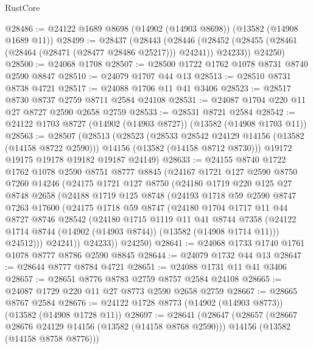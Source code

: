 \begin{lexlean}{RustCore}
\begin{coremodule}
@28486 := @24122 @1689 @8698 (@14902 (@14903 @8698)) (@13582 (@14908 @1689 @11))
@28499 := @28437
    (@28443
      (@28446 (@28452 (@28455 (@28461 (@28464 (@28471 (@28477 @28486 @25217))) @24241)) @24233))
      @24250)
@28500 := @24068 @1708
@28507 := @28500 @1722 @1762 @1078 @8731 @8740 @2590 @8847
@28510 := @24079 @1707 @44 @13
@28513 := @28510 @8731 @8738 @4721
@28517 := @24088 @1706 @11 @41 @3406
@28523 := @28517 @8730 @8737 @2759 @8711 @2584 @24108
@28531 := @24087 @1704 @220 @11 @27 @8727 @2590 @2658 @2759
@28533 := @28531 @8721 @2584
@28542 := @24122 @1703 @8727 (@14902 (@14903 @8727)) (@13582 (@14908 @1703 @11))
@28563 := @28507
    (@28513
      (@28523
        (@28533 @28542 @24129 @14156 (@13582 (@14158 @8722 @2590)))
        @14156
        (@13582 (@14158 @8712 @8730)))
      @19172
      @19175
      @19178
      @19182
      @19187
      @24149)
@28633 := @24155
    @8740
    @1722
    @1762
    @1078
    @2590
    @8751
    @8777
    @8845
    (@24167
      @1721
      @127
      @2590
      @8750
      @7260
      @14246
      (@24175
        @1721
        @127
        @8750
        (@24180
          @1719
          @220
          @125
          @27
          @8748
          @2658
          (@24188
            @1719
            @125
            @8748
            (@24193
              @1718
              @59
              @2590
              @8747
              @7263
              @17600
              (@24175
                @1718
                @59
                @8747
                (@24180
                  @1704
                  @1717
                  @11
                  @44
                  @8727
                  @8746
                  @28542
                  (@24180
                    @1715
                    @1119
                    @11
                    @41
                    @8744
                    @7358
                    (@24122 @1714 @8744 (@14902 (@14903 @8744)) (@13582 (@14908 @1714 @11)))
                    @24512)))
              @24241))
          @24233))
      @24250)
@28641 := @24068 @1733 @1740 @1761 @1078 @8777 @8786 @2590 @8845
@28644 := @24079 @1732 @44 @13
@28647 := @28644 @8777 @8784 @4721
@28651 := @24088 @1731 @11 @41 @3406
@28657 := @28651 @8776 @8783 @2759 @8757 @2584 @24108
@28665 := @24087 @1729 @220 @11 @27 @8773 @2590 @2658 @2759
@28667 := @28665 @8767 @2584
@28676 := @24122 @1728 @8773 (@14902 (@14903 @8773)) (@13582 (@14908 @1728 @11))
@28697 := @28641
    (@28647
      (@28657
        (@28667 @28676 @24129 @14156 (@13582 (@14158 @8768 @2590)))
        @14156
        (@13582 (@14158 @8758 @8776)))

\end{coremodule}
\end{lexlean}

